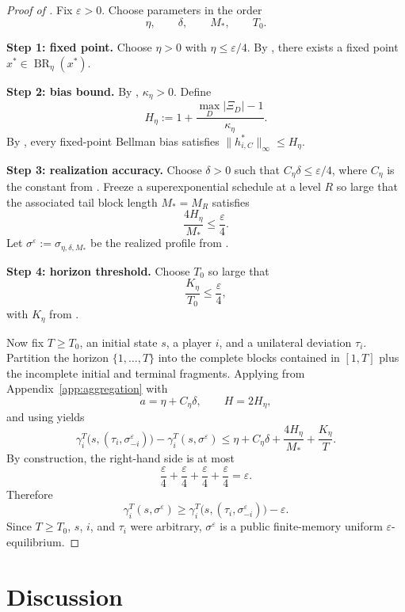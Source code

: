 \documentclass[12pt]{article}
\theoremstyle{definition}
\newcommand{\eps}{\varepsilon}
\newcommand{\1}{\mathbf{1}}
\DeclareMathOperator{\BR}{BR}
\begin{document}
\begin{proof}[Proof of ]
Fix $\eps>0$. Choose parameters in the order
\[
\eta,\qquad \delta,\qquad M_*,\qquad T_0.
\]

\smallskip
\noindent\textbf{Step 1: fixed point.}
Choose $\eta>0$ with $\eta\le \eps/4$. By
, there exists a fixed point $x^*\in\BR_\eta(x^*)$.

\smallskip
\noindent\textbf{Step 2: bias bound.}
By , $\kappa_\eta>0$. Define
\[
H_\eta:=1+\frac{\max_D|\Xi_D|-1}{\kappa_\eta}.
\]
By , every fixed-point Bellman bias satisfies
$\|h_{i,C}^*\|_\infty\le H_\eta$.

\smallskip
\noindent\textbf{Step 3: realization accuracy.}
Choose $\delta>0$ such that $C_\eta\delta\le \eps/4$, where $C_\eta$ is the
constant from . Freeze a superexponential schedule at a
level $R$ so large that the associated tail block length $M_*=M_R$ satisfies
\[
\frac{4H_\eta}{M_*}\le \frac{\eps}{4}.
\]
Let $\sigma^\eps:=\sigma_{\eta,\delta,M_*}$ be the realized profile from
.

\smallskip
\noindent\textbf{Step 4: horizon threshold.}
Choose $T_0$ so large that
\[
\frac{K_\eta}{T_0}\le \frac{\eps}{4},
\]
with $K_\eta$ from .

Now fix $T\ge T_0$, an initial state $s$, a player $i$, and a unilateral deviation
$\tau_i$. Partition the horizon $\{1,\dots,T\}$ into the complete blocks contained
in $[1,T]$ plus the incomplete initial and terminal fragments. Applying
 from Appendix~\ref{app:aggregation} with
\[
a=\eta+C_\eta\delta,
\qquad H=2H_\eta,
\]
and using  yields
\[
\gamma_i^T\bigl(s,(\tau_i,\sigma^\eps_{-i})\bigr)
-
\gamma_i^T(s,\sigma^\eps)
\le
\eta + C_\eta\delta + \frac{4H_\eta}{M_*} + \frac{K_\eta}{T}.
\]
By construction, the right-hand side is at most
\[
\frac{\eps}{4}+\frac{\eps}{4}+\frac{\eps}{4}+\frac{\eps}{4}=\eps.
\]
Therefore
\[
\gamma_i^T(s,\sigma^\eps)
\ge
\gamma_i^T\bigl(s,(\tau_i,\sigma^\eps_{-i})\bigr)-\eps.
\]
Since $T\ge T_0$, $s$, $i$, and $\tau_i$ were arbitrary, $\sigma^\eps$ is a
public finite-memory uniform $\eps$-equilibrium.
\end{proof}

\section{Discussion}
\end{document}
